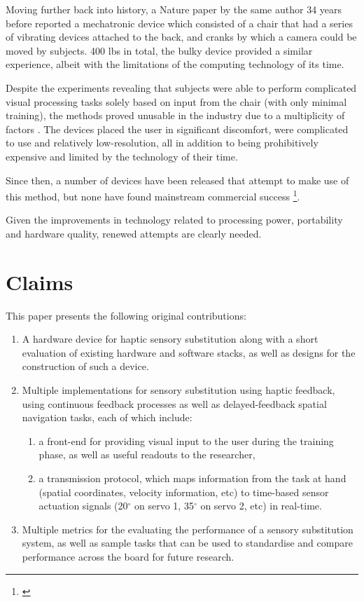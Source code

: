 \documentclass[
12pt, %
oneside, %
english, %
doublespacing, %
headsepline, %
]{MastersDoctoralThesis} %
\begin{document}
Moving further back into history, a Nature paper \parencite{white_vision_1969} by the same author 34 years before reported a mechatronic device which consisted of a chair that had a series of vibrating devices attached to the back, and cranks by which a camera could be moved by subjects. 400 lbs in total, the bulky device provided a similar experience, albeit with the limitations of the computing technology of its time.

Despite the experiments revealing that subjects were able to perform complicated visual processing tasks solely based on input from the chair (with only minimal training), the methods proved unusable in the industry due to a multiplicity of factors \parencite{phillips_predictors_1993}. The devices placed the user in significant discomfort, were complicated to use and relatively low-resolution, all in addition to being prohibitively expensive and limited by the technology of their time.

Since then, a number of devices \parencite{noauthor_brainport_nodate} have been released that attempt to make use of this method, but none have found mainstream commercial success \footnote{\parencite{se_perception_nodate}}.

Given the improvements in technology related to processing power, portability and hardware quality, renewed attempts are clearly needed.

\section{Claims}

This paper presents the following original contributions:

\begin{enumerate}
	\item A hardware device for haptic sensory substitution along with a short evaluation of existing hardware and software stacks, as well as designs for the construction of such a device.
	\item Multiple implementations for sensory substitution using haptic feedback, using continuous feedback processes as well as delayed-feedback spatial navigation tasks, each of which include:
		\begin{enumerate}
			\item a front-end for providing visual input to the user during the training phase, as
		 	well as useful readouts to the researcher,
			\item a transmission protocol, which maps information from the task at hand (spatial coordinates, velocity information, etc) to time-based sensor actuation signals (20$^{\circ}$ on servo 1, 35$^{\circ}$ on servo 2, etc) in real-time.
		\end{enumerate}
	\item Multiple metrics for the evaluating the performance of a sensory substitution system, as well as sample tasks that can be used to standardise and compare performance across the board for future research.
\end{enumerate}
\end{document}

